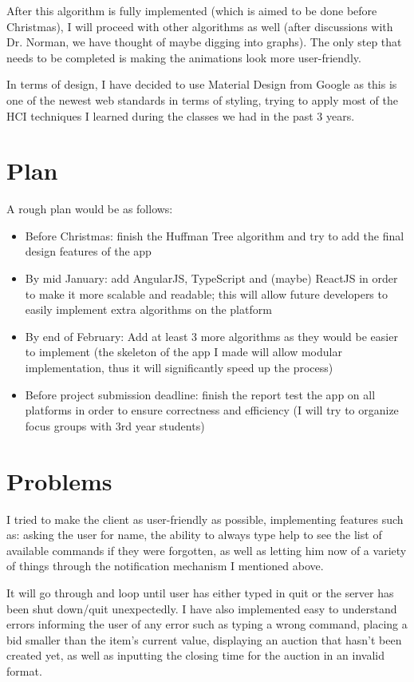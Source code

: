 \documentclass[11pt]{article}
\begin{document}
 After this algorithm is fully implemented (which is aimed to be done before Christmas), I will proceed with other algorithms as well (after discussions with Dr. Norman, we have thought of maybe digging into graphs). The only step that needs to be completed is making the animations look more user-friendly.
 
 In terms of design, I have decided to use Material Design from Google as this is one of the newest web standards in terms of styling, trying to apply most of the HCI techniques I learned during the classes we had in the past 3 years.
 
 \section{Plan}
 A rough plan would be as follows:
 \begin{itemize}
 	\item Before Christmas: finish the Huffman Tree algorithm and try to add the final design features of the app
 	\item By mid January: add AngularJS, TypeScript and (maybe) ReactJS in order to make it more scalable and readable; this will allow future developers to easily implement extra algorithms on the platform
 	\item By end of February: Add at least 3 more algorithms as they would be easier to implement (the skeleton of the app I made will allow modular implementation, thus it will significantly speed up the process)
 	\item Before project submission deadline: finish the report test the app on all platforms in order to ensure correctness and efficiency (I will try to organize focus groups with 3rd year students)
 \end{itemize}
 
\section{Problems}
 I tried to make the client as user-friendly as possible, implementing features such as: asking the user for name, the ability to always type help to see the list of available commands if they were forgotten, as well as letting him now of a variety of things through the notification mechanism I mentioned above.
 
 It will go through and loop until user has either typed in quit or the server has been shut down/quit unexpectedly. I have also implemented easy to understand errors informing the user of any error such as typing a wrong command, placing a bid smaller than the item's current value, displaying an auction that hasn't been created yet, as well as inputting the closing time for the auction in an invalid format.
 
\end{document}
